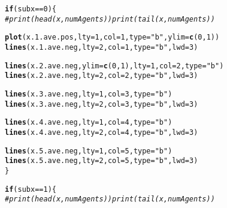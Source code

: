 \documentclass{article}\usepackage[]{graphicx}\usepackage[]{color}
\makeatletter
\newcommand{\hlnum}[1]{\textcolor[rgb]{0.686,0.059,0.569}{#1}}%
\newcommand{\hlstr}[1]{\textcolor[rgb]{0.192,0.494,0.8}{#1}}%
\newcommand{\hlcom}[1]{\textcolor[rgb]{0.678,0.584,0.686}{\textit{#1}}}%
\newcommand{\hlopt}[1]{\textcolor[rgb]{0,0,0}{#1}}%
\newcommand{\hlstd}[1]{\textcolor[rgb]{0.345,0.345,0.345}{#1}}%
\newcommand{\hlkwa}[1]{\textcolor[rgb]{0.161,0.373,0.58}{\textbf{#1}}}%
\newcommand{\hlkwc}[1]{\textcolor[rgb]{0.333,0.667,0.333}{#1}}%
\newcommand{\hlkwd}[1]{\textcolor[rgb]{0.737,0.353,0.396}{\textbf{#1}}}%
\newenvironment{kframe}{%
 \def\at@end@of@kframe{}%
 \ifinner\ifhmode%
  \def\at@end@of@kframe{\end{minipage}}%
  \begin{minipage}{\columnwidth}%
 \fi\fi%
 \def\FrameCommand##1{\hskip\@totalleftmargin \hskip-\fboxsep
 \colorbox{shadecolor}{##1}\hskip-\fboxsep
     \hskip-\linewidth \hskip-\@totalleftmargin \hskip\columnwidth}%
 \MakeFramed {\advance\hsize-\width
   \@totalleftmargin\z@ \linewidth\hsize
   \@setminipage}}%
 {\par\unskip\endMakeFramed%
 \at@end@of@kframe}
\newenvironment{knitrout}{}{} %
\makeatother
\begin{document}
\begin{knitrout}
\begin{kframe}
\begin{alltt}
    \hlkwa{if} \hlstd{(subx} \hlopt{==} \hlnum{0}\hlstd{) \{}
        \hlcom{# print(head(x, numAgents)) print(tail(x, numAgents))}

        \hlkwd{plot}\hlstd{(x.1.ave.pos,} \hlkwc{lty} \hlstd{=} \hlnum{1}\hlstd{,} \hlkwc{col} \hlstd{=} \hlnum{1}\hlstd{,} \hlkwc{type} \hlstd{=} \hlstr{"b"}\hlstd{,} \hlkwc{ylim} \hlstd{=} \hlkwd{c}\hlstd{(}\hlnum{0}\hlstd{,} \hlnum{1}\hlstd{))}
        \hlkwd{lines}\hlstd{(x.1.ave.neg,} \hlkwc{lty} \hlstd{=} \hlnum{2}\hlstd{,} \hlkwc{col} \hlstd{=} \hlnum{1}\hlstd{,} \hlkwc{type} \hlstd{=} \hlstr{"b"}\hlstd{,} \hlkwc{lwd} \hlstd{=} \hlnum{3}\hlstd{)}

        \hlkwd{lines}\hlstd{(x.2.ave.neg,} \hlkwc{ylim} \hlstd{=} \hlkwd{c}\hlstd{(}\hlnum{0}\hlstd{,} \hlnum{1}\hlstd{),} \hlkwc{lty} \hlstd{=} \hlnum{1}\hlstd{,} \hlkwc{col} \hlstd{=} \hlnum{2}\hlstd{,} \hlkwc{type} \hlstd{=} \hlstr{"b"}\hlstd{)}
        \hlkwd{lines}\hlstd{(x.2.ave.neg,} \hlkwc{lty} \hlstd{=} \hlnum{2}\hlstd{,} \hlkwc{col} \hlstd{=} \hlnum{2}\hlstd{,} \hlkwc{type} \hlstd{=} \hlstr{"b"}\hlstd{,} \hlkwc{lwd} \hlstd{=} \hlnum{3}\hlstd{)}

        \hlkwd{lines}\hlstd{(x.3.ave.neg,} \hlkwc{lty} \hlstd{=} \hlnum{1}\hlstd{,} \hlkwc{col} \hlstd{=} \hlnum{3}\hlstd{,} \hlkwc{type} \hlstd{=} \hlstr{"b"}\hlstd{)}
        \hlkwd{lines}\hlstd{(x.3.ave.neg,} \hlkwc{lty} \hlstd{=} \hlnum{2}\hlstd{,} \hlkwc{col} \hlstd{=} \hlnum{3}\hlstd{,} \hlkwc{type} \hlstd{=} \hlstr{"b"}\hlstd{,} \hlkwc{lwd} \hlstd{=} \hlnum{3}\hlstd{)}

        \hlkwd{lines}\hlstd{(x.4.ave.neg,} \hlkwc{lty} \hlstd{=} \hlnum{1}\hlstd{,} \hlkwc{col} \hlstd{=} \hlnum{4}\hlstd{,} \hlkwc{type} \hlstd{=} \hlstr{"b"}\hlstd{)}
        \hlkwd{lines}\hlstd{(x.4.ave.neg,} \hlkwc{lty} \hlstd{=} \hlnum{2}\hlstd{,} \hlkwc{col} \hlstd{=} \hlnum{4}\hlstd{,} \hlkwc{type} \hlstd{=} \hlstr{"b"}\hlstd{,} \hlkwc{lwd} \hlstd{=} \hlnum{3}\hlstd{)}

        \hlkwd{lines}\hlstd{(x.5.ave.neg,} \hlkwc{lty} \hlstd{=} \hlnum{1}\hlstd{,} \hlkwc{col} \hlstd{=} \hlnum{5}\hlstd{,} \hlkwc{type} \hlstd{=} \hlstr{"b"}\hlstd{)}
        \hlkwd{lines}\hlstd{(x.5.ave.neg,} \hlkwc{lty} \hlstd{=} \hlnum{2}\hlstd{,} \hlkwc{col} \hlstd{=} \hlnum{5}\hlstd{,} \hlkwc{type} \hlstd{=} \hlstr{"b"}\hlstd{,} \hlkwc{lwd} \hlstd{=} \hlnum{3}\hlstd{)}
    \hlstd{\}}

    \hlkwa{if} \hlstd{(subx} \hlopt{==} \hlnum{1}\hlstd{) \{}
        \hlcom{# print(head(x, numAgents)) print(tail(x, numAgents))}


\end{alltt}
\end{kframe}
\end{knitrout}
\end{document}

